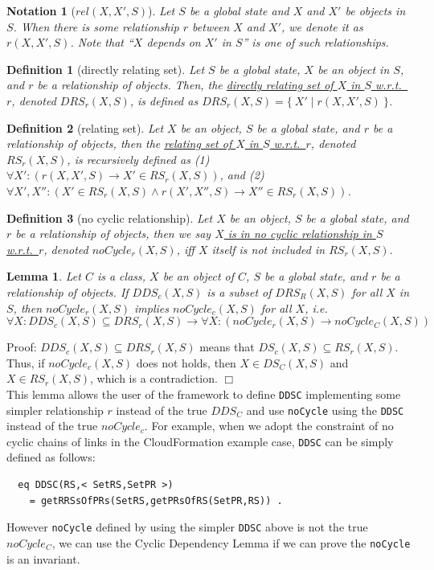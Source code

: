 \documentclass[12pt]{report}
\newtheorem{lemma}{Lemma}
\newtheorem{notation}{Notation}
\newtheorem{definition}{Definition}
\newcommand{\ra}{\rightarrow}
\newcommand{\ul}{\underline}
\begin{document}
\begin{notation}[$rel(X,X',S)$]
  Let $S$ be a global state and $X$ and $X'$ be objects in $S$.  When
  there is some relationship $r$ between $X$ and $X'$, we denote it
  as \ul{$r(X,X',S)$}. Note that ``$X$ depends on $X'$ in $S$'' is one
  of such relationships.
\end{notation}

\begin{definition}[directly relating set]
Let $S$ be a global state, $X$ be an object in $S$, and $r$ be a
relationship of objects. Then, the \ul{directly relating set of $X$ in
  $S$ w.r.t.\ $r$}, denoted \ul{$DRS_r(X,S)$}, is defined as
$DRS_r(X,S)=\{~X'\mid r(X,X',S)~\}$.
\end{definition}

\begin{definition}[relating set]
Let $X$ be an object, $S$ be a global state, and $r$ be a relationship
of objects, then the \ul{relating set of $X$ in $S$
  w.r.t.\ $r$}, denoted \ul{$RS_r(X,S)$}, is recursively defined
as (1) $\forall X': (r(X,X',S) \ra X'\in RS_r(X,S))$, and (2)
$\forall X',X'': (X'\in RS_r(X,S) \land r(X',X'',S) \ra X''\in
RS_r(X,S))$.
\end{definition}

\begin{definition}[no cyclic relationship]
Let $X$ be an object, $S$ be a global state, and $r$ be a relationship
of objects, then we say \ul{$X$ is in no cyclic relationship in $S$
  w.r.t.\ $r$}, denoted \ul{$noCycle_r(X,S)$}, iff $X$ itself is not
included in $RS_r(X,S)$.
\end{definition}

\begin{lemma}
Let $C$ is a class, $X$ be an object of $C$, $S$ be a global state,
and $r$ be a relationship of objects. If $DDS_c(X,S)$ is a subset of
$DRS_R(X,S)$ for all $X$ in $S$, then $noCycle_r(X,S)$ implies
$noCycle_c(X,S)$ for all $X$, i.e.
\[\forall X:DDS_c(X,S)\subseteq DRS_r(X,S) \ra \forall X: (noCycle_r(X,S) \ra
noCycle_C(X,S))\]
\end{lemma}
Proof: $DDS_c(X,S)\subseteq DRS_r(X,S)$ means that $DS_c(X,S)\subseteq
RS_r(X,S)$.  Thus, if $noCycle_c(X,S)$ does not holds, then $X\in
DS_C(X,S)$ and $X\in RS_r(X,S)$, which is a contradiction. $\Box$\\

This lemma allows the user of the framework to define {\tt DDSC}
implementing some simpler relationship $r$ instead of the true $DDS_C$
and use {\tt noCycle} using the {\tt DDSC} instead of the true
$noCycle_c$. For example, when we adopt the constraint of no cyclic
chains of links in the CloudFormation example case, {\tt DDSC} can be
simply defined as follows:
\begin{verbatim}
  eq DDSC(RS,< SetRS,SetPR >)
    = getRRSsOfPRs(SetRS,getPRsOfRS(SetPR,RS)) .
\end{verbatim}
However {\tt noCycle} defined by using the simpler {\tt DDSC} above is
 not the true $noCycle_C$, we can use the Cyclic Dependency Lemma if
 we can prove the {\tt noCycle} is an invariant.
\end{document}
